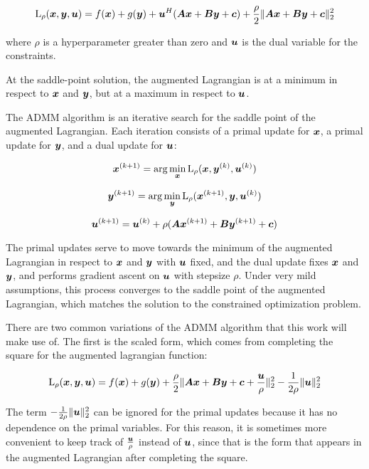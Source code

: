 \begin{equation}
\operatorname{L}_{\rho}(\bm{x},\bm{y},\bm{u}) = f(\bm{x}) + g(\bm{y}) + \bm{u}^H(\bm{A}\bm{x} + \bm{B}\bm{y} + \bm{c}) + \frac{\rho}{2}\|\bm{A}\bm{x} + \bm{B}\bm{y} + \bm{c}\|_2^2
\end{equation}

where $\rho$ is a hyperparameter greater than zero and $\bm{u}$ is the dual variable for the constraints.

At the saddle-point solution, the augmented Lagrangian is at a minimum in respect to $\bm{x}$ and $\bm{y}$, but at a maximum in respect to $\bm{u}$.

The ADMM algorithm is an iterative search for the saddle point of the augmented Lagrangian. Each iteration consists of a primal update for $\bm{x}$, a primal update for $\bm{y}$, and a dual update for $\bm{u}$:

\begin{equation}
\bm{x}^{(k + 1)} = \arg\min_{\bm{x}} \operatorname{L}_{\rho}(\bm{x},\bm{y}^{(k)},\bm{u}^{(k)})
\end{equation}

\begin{equation}
\bm{y}^{(k + 1)} = \arg\min_{\bm{y}} \operatorname{L}_{\rho}(\bm{x}^{(k + 1)},\bm{y},\bm{u}^{(k)})
\end{equation}

\begin{equation}
\bm{u}^{(k + 1)} = \bm{u}^{(k)} + \rho(\bm{A}\bm{x}^{(k + 1)} + \bm{B}\bm{y}^{(k + 1)} + \bm{c})
\end{equation}

The primal updates serve to move towards the minimum of the augmented Lagrangian in respect to $\bm{x}$ and $\bm{y}$ with $\bm{u}$ fixed, and the dual update fixes $\bm{x}$ and $\bm{y}$, and performs gradient ascent on $\bm{u}$ with stepsize $\rho$. Under very mild assumptions, this process converges to the saddle point of the augmented Lagrangian, which matches the solution to the constrained optimization problem.

There are two common variations of the ADMM algorithm that this work will make use of.  The first is the scaled form, which comes from completing the square for the augmented lagrangian function:

\begin{equation}
\operatorname{L}_{\rho}(\bm{x},\bm{y},\bm{u}) = f(\bm{x}) + g(\bm{y}) + \frac{\rho}{2}\|\bm{A}\bm{x} + \bm{B}\bm{y} + \bm{c} + \frac{\bm{u}}{\rho}\|_2^2 - \frac{1}{2\rho}\|\bm{u}\|_2^2
\end{equation}

The term $-\frac{1}{2\rho}\|\bm{u}\|_2^2$ can be ignored for the primal updates because it has no dependence on the primal variables. For this reason, it is sometimes more convenient to keep track of $\frac{\bm{u}}{\rho}$ instead of $\bm{u}$, since that is the form that appears in the augmented Lagrangian after completing the square.

